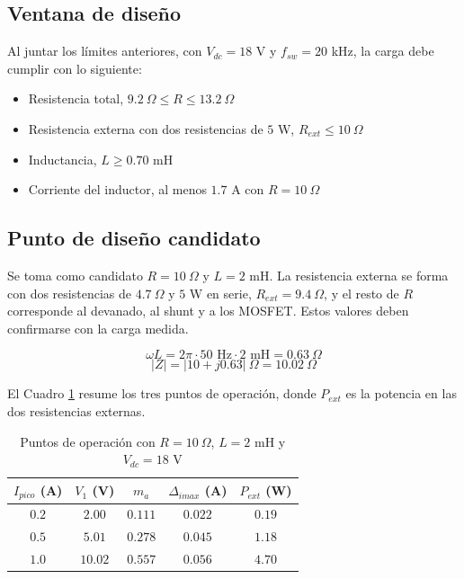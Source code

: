 \documentclass[spanish,10pt,a4paper,titlepage]{article}
\begin{document}
	\subsection{Ventana de diseño}
	Al juntar los límites anteriores, con $V_{dc} = 18$ V y $f_{sw} = 20$ kHz, la carga debe cumplir con lo siguiente:
	\vspace{0.3 cm}
	\begin{itemize}
		\item Resistencia total, $9.2\ \Omega \leq R \leq 13.2\ \Omega$
		\item Resistencia externa con dos resistencias de $5$ W, $R_{ext} \leq 10\ \Omega$
		\item Inductancia, $L \geq 0.70$ mH
		\item Corriente del inductor, al menos $1.7$ A con $R = 10\ \Omega$
	\end{itemize}

	\subsection{Punto de diseño candidato}
	Se toma como candidato $R = 10\ \Omega$ y $L = 2$ mH. La resistencia externa se forma con dos resistencias de $4.7\ \Omega$ y $5$ W en serie, $R_{ext} = 9.4\ \Omega$, y el resto de $R$ corresponde al devanado, al shunt y a los MOSFET. Estos valores deben confirmarse con la carga medida.

	\[\omega L = 2\pi \cdot 50 \text{ Hz} \cdot 2 \text{ mH} = 0.63\ \Omega\]
	\[|Z| = |10 + j0.63|\ \Omega = 10.02\ \Omega\]

	El Cuadro \ref{tab:candidato} resume los tres puntos de operación, donde $P_{ext}$ es la potencia en las dos resistencias externas.

	\begin{table}[H]
		\centering
		\caption{Puntos de operación con $R = 10\ \Omega$, $L = 2$ mH y $V_{dc} = 18$ V}
		\label{tab:candidato}
		\begin{tabular}{ccccc}
			\hline
			$I_{pico}$ (A) & $V_1$ (V) & $m_a$ & $\Delta_{imax}$ (A) & $P_{ext}$ (W) \\
			\hline
			$0.2$ & $2.00$ & $0.111$ & $0.022$ & $0.19$ \\
			$0.5$ & $5.01$ & $0.278$ & $0.045$ & $1.18$ \\
			$1.0$ & $10.02$ & $0.557$ & $0.056$ & $4.70$ \\
			\hline
		\end{tabular}
	\end{table}
\end{document}
